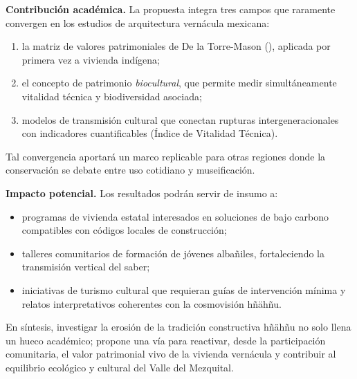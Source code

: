 \textbf{Contribución académica.}
La propuesta integra tres campos que raramente convergen en los
estudios de arquitectura vernácula mexicana:

\begin{enumerate}
	\item la matriz de valores patrimoniales de De la Torre-Mason
	      (\citeyear{delatorre2002values}), aplicada por primera vez a
	      vivienda indígena;
	\item el concepto de patrimonio \emph{biocultural}, que permite medir
	      simultáneamente vitalidad técnica y biodiversidad asociada;
	\item modelos de transmisión cultural que conectan rupturas
	      intergeneracionales con indicadores cuantificables (Índice de
	      Vitalidad Técnica).
\end{enumerate}

Tal convergencia aportará un marco replicable para otras regiones
donde la conservación se debate entre uso cotidiano y museificación.

\textbf{Impacto potencial.}
Los resultados podrán servir de insumo a:

\begin{itemize}
	\item programas de vivienda estatal interesados en soluciones de bajo
	      carbono compatibles con códigos locales de construcción;
	\item talleres comunitarios de formación de jóvenes albañiles,
	      fortaleciendo la transmisión vertical del saber;
	\item iniciativas de turismo cultural que requieran guías de
	      intervención mínima y relatos interpretativos coherentes con la
	      cosmovisión hñähñu.
\end{itemize}

En síntesis, investigar la erosión de la tradición constructiva hñähñu
no solo llena un hueco académico; propone una vía para reactivar,
desde la participación comunitaria, el valor patrimonial vivo de la
vivienda vernácula y contribuir al equilibrio ecológico y cultural del
Valle del Mezquital.
